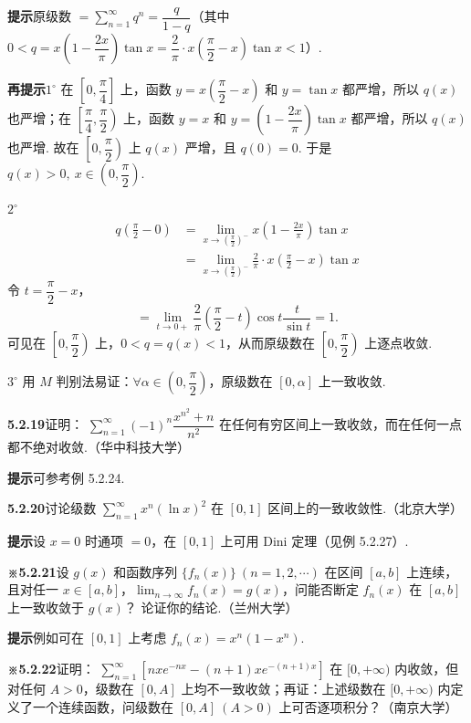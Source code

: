 \documentclass[UTF8,12pt,a4paper,fontset=fandol]{ctexart}
\begin{document}
\noindent\textbf{提示}\quad 原级数
$\displaystyle=\sum_{n=1}^{\infty}q^n=\dfrac q{1-q}$（其中
$0<q=x\left(1-\dfrac{2x}{\pi}\right)\tan x
=\dfrac2\pi\cdot x\left(\dfrac\pi2-x\right)\tan x<1$）.

\noindent\textbf{再提示}\quad $1^\circ$ 在 $\left[0,\dfrac\pi4\right]$ 上，函数
$y=x\left(\dfrac\pi2-x\right)$ 和 $y=\tan x$ 都严增，所以 $q(x)$ 也严增；在
$\left[\dfrac\pi4,\dfrac\pi2\right)$ 上，函数 $y=x$ 和
$y=\left(1-\dfrac{2x}{\pi}\right)\tan x$ 都严增，所以 $q(x)$ 也严增. 故在
$\left[0,\dfrac\pi2\right)$ 上 $q(x)$ 严增，且 $q(0)=0$. 于是
$q(x)>0,\ x\in\left(0,\dfrac\pi2\right)$.

$2^\circ$
\[
\begin{aligned}
q\left(\frac\pi2-0\right)
&=\lim_{x\to(\frac\pi2)^-}x\left(1-\frac{2x}{\pi}\right)\tan x\\
&=\lim_{x\to(\frac\pi2)^-}\frac2\pi\cdot x\left(\frac\pi2-x\right)\tan x
\end{aligned}
\]
令 $t=\dfrac\pi2-x$，
\[
  =\lim_{t\to0+}\frac2\pi\left(\frac\pi2-t\right)\cos t\frac t{\sin t}=1.
\]
可见在 $\left[0,\dfrac\pi2\right)$ 上，$0<q=q(x)<1$，从而原级数在
$\left[0,\dfrac\pi2\right)$ 上逐点收敛.

$3^\circ$ 用 $M$ 判别法易证：$\forall\alpha\in\left(0,\dfrac\pi2\right)$，原级数在 $[0,\alpha]$ 上一致收敛.

\noindent\textbf{5.2.19}\quad 证明：
$\displaystyle\sum_{n=1}^{\infty}(-1)^n\dfrac{x^{n^2}+n}{n^2}$ 在任何有穷区间上一致收敛，而在任何一点都不绝对收敛.（华中科技大学）

\noindent\textbf{提示}\quad 可参考例 5.2.24.

\noindent\textbf{5.2.20}\quad 讨论级数 $\displaystyle\sum_{n=1}^{\infty}x^n(\ln x)^2$ 在 $[0,1]$ 区间上的一致收敛性.（北京大学）

\noindent\textbf{提示}\quad 设 $x=0$ 时通项 $=0$，在 $[0,1]$ 上可用 Dini 定理（见例 5.2.27）.

\noindent\textbf{※5.2.21}\quad 设 $g(x)$ 和函数序列 $\{f_n(x)\}\ (n=1,2,\cdots)$ 在区间 $[a,b]$ 上连续，且对任一
$x\in[a,b]$，$\displaystyle\lim_{n\to\infty}f_n(x)=g(x)$，问能否断定 $f_n(x)$ 在 $[a,b]$ 上一致收敛于 $g(x)$？
论证你的结论.（兰州大学）

\noindent\textbf{提示}\quad 例如可在 $[0,1]$ 上考虑 $f_n(x)=x^n(1-x^n)$.

\noindent\textbf{※5.2.22}\quad 证明：
$\displaystyle\sum_{n=1}^{\infty}\left[nxe^{-nx}-(n+1)xe^{-(n+1)x}\right]$ 在 $[0,+\infty)$ 内收敛，但对任何
$A>0$，级数在 $[0,A]$ 上均不一致收敛；再证：上述级数在 $[0,+\infty)$ 内定义了一个连续函数，问级数在
$[0,A]\ (A>0)$ 上可否逐项积分？（南京大学）
\end{document}
